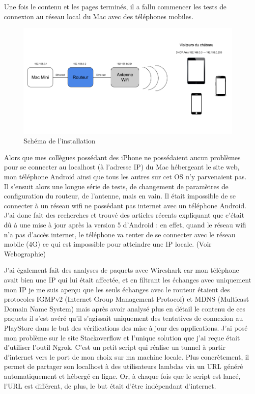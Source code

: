 \documentclass[report]{tnreport}
\begin{document}
Une fois le contenu et les pages terminés, il a fallu commencer les tests de connexion au réseau local du Mac avec des téléphones mobiles.


\begin{figure}[h]
  \centering
  \includegraphics[width=18cm]{figures/Montage}
  \caption{Schéma de l'installation}
  
  \label{fig:installation}
\end{figure}


Alors que mes collègues possédant des iPhone ne possédaient aucun problèmes pour se connecter au localhost (à l’adresse IP) du Mac hébergeant le site web, mon téléphone Android ainsi que tous les autres sur cet OS n’y parvenaient pas. Il s'ensuit alors une longue série de tests, de changement de paramètres de configuration du routeur, de l’antenne, mais en vain. Il était impossible de se connecter à un réseau wifi ne possédant pas internet avec un téléphone Android. J’ai donc fait des recherches et trouvé des articles récents expliquant que c’était dû à une mise à jour après la version 5 d’Android : en effet, quand le réseau wifi n’a pas d’accès internet, le téléphone va tenter de se connecter avec le réseau mobile (4G) ce qui est impossible pour atteindre une IP locale. (Voir Webographie)

J’ai également fait des analyses de paquets avec Wireshark car mon téléphone avait bien une IP qui lui était affectée, et en filtrant les échanges avec uniquement mon IP je me suis aperçu que les seuls échanges avec le routeur étaient des protocoles IGMPv2 (Internet Group Management Protocol) et MDNS (Multicast Domain Name System) mais après avoir analysé plus en détail le contenu de ces paquets il s’est avéré qu’il s’agissait uniquement des tentatives de connexion au PlayStore dans le but des vérifications des mise à jour des applications. J’ai posé mon problème sur le site Stackoverflow et l’unique solution que j’ai reçue était d’utiliser l’outil Ngrok. C’est un petit script qui réalise un tunnel à partir d’internet vers le port de mon choix sur ma machine locale. Plus concrètement, il permet de partager son localhost à des utilisateurs lambdas via un URL généré automatiquement et hébergé en ligne. Or, à chaque fois que le script est lancé, l’URL est différent, de plus, le but était d’être indépendant d'internet. 
\end{document}

